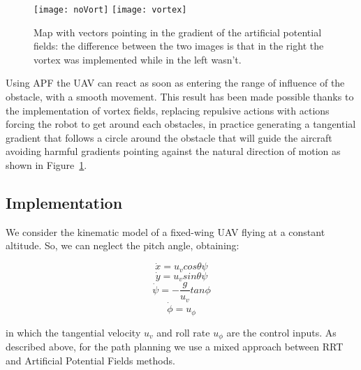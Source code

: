 \documentclass[oneside,onecolumn]{article}
\begin{document}
\begin{figure}
\centering
   {\texttt{[image: noVort]}} \quad
   {\texttt{[image: vortex]}} \\
\caption{Map with vectors pointing in the gradient of the artificial potential
  fields: the difference between the two images is that in the right the vortex
  was implemented while in the left wasn't.}
\label{fig:subfig1}
\end{figure}

Using APF the UAV can react as soon as entering the range of influence of the
obstacle, with a smooth movement. This result has been made possible thanks to
the implementation of vortex fields, replacing repulsive actions with actions
forcing the robot to get around each obstacles, in practice generating a
tangential gradient that follows a circle around the obstacle that will guide
the aircraft avoiding harmful gradients pointing against the natural direction
of motion as shown in Figure~\ref{fig:subfig1}.
\subsection{Implementation}

We consider the kinematic model of a fixed-wing UAV flying at a constant
altitude.
So, we can neglect the pitch angle, obtaining:
\begin{center}
\[
  \dot{x} = u_{v}cos{\theta} \psi
\]
\[
  \dot{y} = u_{v}sin{\theta} \psi
\]
\[
  \dot{\psi} = - \frac{g}{u_{v}} tan \phi 
\]
\[
  \dot{\phi} = u_{\phi}
\]
\end{center}

in which the tangential velocity $u_{v}$ and roll rate $u_{\phi}$ are the control inputs.
As described above, for the path planning we use a mixed approach
between RRT and Artificial Potential Fields methods.\\\par
\end{document}
